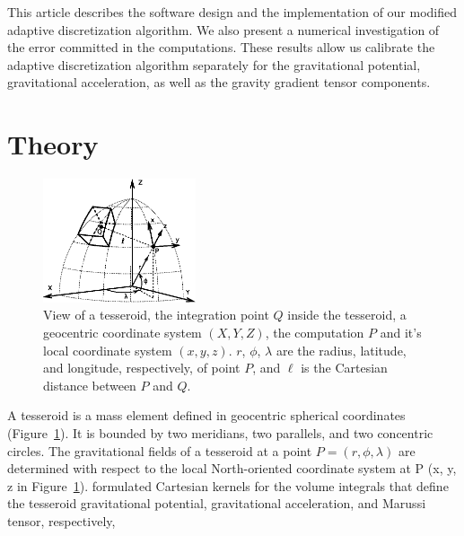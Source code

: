 \documentclass[paper,twocolumn,twoside]{geophysics}
\begin{document}

This article describes the software design and the implementation
of our modified adaptive discretization algorithm.
We also present a numerical investigation of the error committed
in the computations.
These results allow us calibrate the adaptive discretization algorithm
separately for the gravitational potential, gravitational acceleration,
as well as the gravity gradient tensor components.


\section{Theory}


\begin{figure}
    \centering
    \includegraphics[width=0.4\textwidth]{figs/tesseroid}
    \caption{
        View of a tesseroid,
        the integration point $Q$ inside the tesseroid,
        a geocentric coordinate system $(X, Y, Z)$,
        the computation $P$ and it's local coordinate system $(x, y, z)$.
        $r$, $\phi$, $\lambda$ are
        the radius, latitude, and longitude, respectively, of point $P$,
        and $\ell$ is the Cartesian distance between $P$ and $Q$.
    }
    \label{fig:tesseroid}
\end{figure}

A tesseroid is a mass element defined in geocentric spherical
coordinates
(Figure~\ref{fig:tesseroid}).
It is bounded by two meridians, two parallels, and two concentric circles.
The gravitational fields of a tesseroid at a point $P = (r,\phi,\lambda)$
are determined with respect to the local North-oriented coordinate system at
P (x, y, z in Figure~\ref{fig:tesseroid}).
\citet{Grombein2013} formulated Cartesian kernels for the volume integrals
that define the tesseroid gravitational potential, gravitational acceleration,
and Marussi tensor, respectively,
\end{document}
